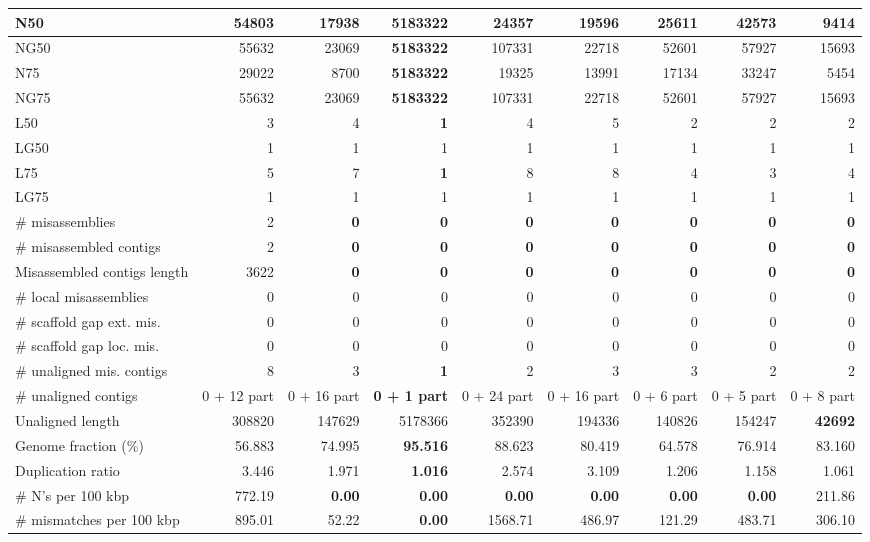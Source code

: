 \documentclass[12pt,a4paper]{article}
\begin{document}
\begin{table}[ht]
\begin{center}
\begin{tabular}{|l*{8}{|r}|}
N50 & 54803 & 17938 & {\bf 5183322} & 24357 & 19596 & 25611 & 42573 & 9414 \\ \hline
NG50 & 55632 & 23069 & {\bf 5183322} & 107331 & 22718 & 52601 & 57927 & 15693 \\ \hline
N75 & 29022 & 8700 & {\bf 5183322} & 19325 & 13991 & 17134 & 33247 & 5454 \\ \hline
NG75 & 55632 & 23069 & {\bf 5183322} & 107331 & 22718 & 52601 & 57927 & 15693 \\ \hline
L50 & 3 & 4 & {\bf 1} & 4 & 5 & 2 & 2 & 2 \\ \hline
LG50 & 1 & 1 & 1 & 1 & 1 & 1 & 1 & 1 \\ \hline
L75 & 5 & 7 & {\bf 1} & 8 & 8 & 4 & 3 & 4 \\ \hline
LG75 & 1 & 1 & 1 & 1 & 1 & 1 & 1 & 1 \\ \hline
\# misassemblies & 2 & {\bf 0} & {\bf 0} & {\bf 0} & {\bf 0} & {\bf 0} & {\bf 0} & {\bf 0} \\ \hline
\# misassembled contigs & 2 & {\bf 0} & {\bf 0} & {\bf 0} & {\bf 0} & {\bf 0} & {\bf 0} & {\bf 0} \\ \hline
Misassembled contigs length & 3622 & {\bf 0} & {\bf 0} & {\bf 0} & {\bf 0} & {\bf 0} & {\bf 0} & {\bf 0} \\ \hline
\# local misassemblies & 0 & 0 & 0 & 0 & 0 & 0 & 0 & 0 \\ \hline
\# scaffold gap ext. mis. & 0 & 0 & 0 & 0 & 0 & 0 & 0 & 0 \\ \hline
\# scaffold gap loc. mis. & 0 & 0 & 0 & 0 & 0 & 0 & 0 & 0 \\ \hline
\# unaligned mis. contigs & 8 & 3 & {\bf 1} & 2 & 3 & 3 & 2 & 2 \\ \hline
\# unaligned contigs & 0 + 12 part & 0 + 16 part & {\bf 0 + 1 part} & 0 + 24 part & 0 + 16 part & 0 + 6 part & 0 + 5 part & 0 + 8 part \\ \hline
Unaligned length & 308820 & 147629 & 5178366 & 352390 & 194336 & 140826 & 154247 & {\bf 42692} \\ \hline
Genome fraction (\%) & 56.883 & 74.995 & {\bf 95.516} & 88.623 & 80.419 & 64.578 & 76.914 & 83.160 \\ \hline
Duplication ratio & 3.446 & 1.971 & {\bf 1.016} & 2.574 & 3.109 & 1.206 & 1.158 & 1.061 \\ \hline
\# N's per 100 kbp & 772.19 & {\bf 0.00} & {\bf 0.00} & {\bf 0.00} & {\bf 0.00} & {\bf 0.00} & {\bf 0.00} & 211.86 \\ \hline
\# mismatches per 100 kbp & 895.01 & 52.22 & {\bf 0.00} & 1568.71 & 486.97 & 121.29 & 483.71 & 306.10 \\ \hline

\end{tabular}
\end{center}
\end{table}
\end{document}

